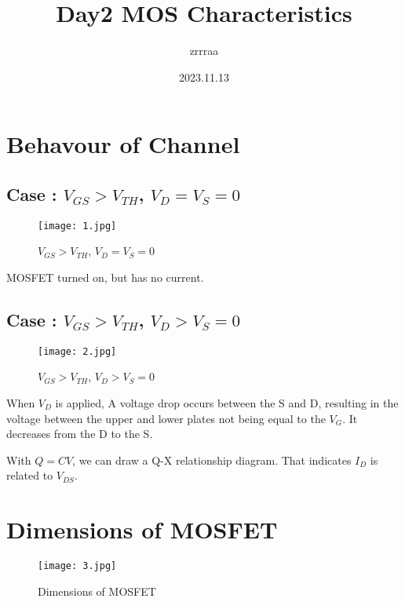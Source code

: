 \documentclass[fontset=windows]{article}
\title{\heiti\zihao{2} Day2 MOS Characteristics \uppercase\expandafter{\romannumeral1}}
\author{\songti zrrraa}
\date{2023.11.13}
\begin{document}
\maketitle
\thispagestyle{empty}

\section*{Behavour of Channel}

\subsection*{Case \uppercase\expandafter{}: $V_{GS}>V_{TH}$, $V_D=V_S=0$}

\begin{figure}[htbp]
    \centering
    \texttt{[image: 1.jpg]}
    \captionsetup{labelformat=empty}
    \caption{$V_{GS}>V_{TH}$, $V_D=V_S=0$}
    \label{1}
\end{figure}

MOSFET turned on, but has no current.

\subsection*{Case \uppercase\expandafter{}: $V_{GS}>V_{TH}$, $V_D>V_S=0$}

\begin{figure}[htbp]
    \centering
    \texttt{[image: 2.jpg]}
    \captionsetup{labelformat=empty}
    \caption{$V_{GS}>V_{TH}$, $V_D>V_S=0$}
    \label{2}
\end{figure}

When $V_D$ is applied, A voltage drop occurs between the S and D,
resulting in the voltage between the upper and lower plates not being equal to the $V_G$.
It decreases from the D to the S.

With $Q=CV$, we can draw a Q-X relationship diagram. That indicates $I_D$ is related to $V_{DS}$.

\section*{Dimensions of MOSFET}

\begin{figure}[htbp]
    \centering
    \texttt{[image: 3.jpg]}
    \captionsetup{labelformat=empty}
    \caption{Dimensions of MOSFET}
    \label{3}
\end{figure}
\end{document}
